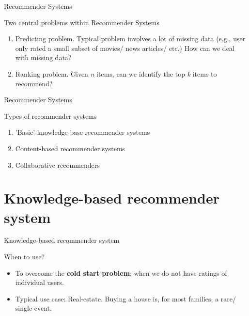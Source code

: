 \documentclass[compress]{beamer}
\begin{document}
\begin{frame}{Recommender Systems} 
	\begin{block}{Two central problems within Recommender Systems}
		\begin{enumerate}
			\item<2-> \alert{Predicting problem}. Typical problem involves a lot of missing data (e.g., user only rated a small subset of movies/ news articles/ etc.) How can we deal with missing data? 
			\item<3-> \alert{Ranking problem}.  Given \textit{n} items, can we identify the top \textit{k} items to recommend?
		\end{enumerate}
	\end{block}
\end{frame}

\begin{frame}{Recommender Systems} 
	\begin{block}{Types of recommender systems  \parencite{Wieland2021, Locherbach2018, Moller2018}}
\begin{enumerate}
	\item 'Basic' knowledge-base recommender systems
	\item Content-based recommender systems
	\item Collaborative  recommenders 
\end{enumerate}
	\end{block}
\end{frame}

\section{Knowledge-based recommender system}
\begin{frame}{Knowledge-based recommender system} 
	\begin{block}{When to use?}
		\begin{itemize}
			
			\item<2-> To overcome the \textbf{cold start problem}; when we do not have ratings of individual users. 
			\item<3-> Typical use case: Real-estate. Buying a house is, for most families, a rare/ single event. 
		\end{itemize}
	\end{block}
\end{frame}

\end{document}
